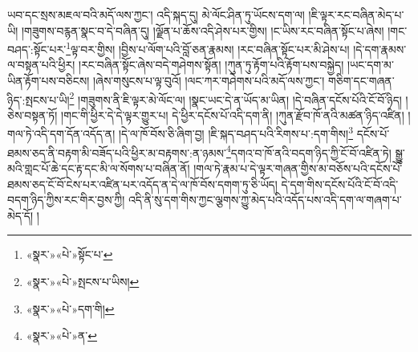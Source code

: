 ཡབ་དང་སྲས་མཇལ་བའི་མདོ་ལས་ཀྱང་། འདི་སྐད་དུ། མེ་ལོང་ཤིན་ཏུ་ཡོངས་དག་ལ། །ཇི་ལྟར་རང་བཞིན་མེད་པ་ཡི། །གཟུགས་བརྙན་སྣང་བ་དེ་བཞིན་དུ། །ལྗོན་པ་ཆོས་འདི་ཤེས་པར་གྱིས། །ང་ཡིས་རང་བཞིན་སྟོང་པ་ཞེས། །གང་བཤད་:སྟོང་པར་\footnote{«སྣར་»«པེ་»སྟོང་པ་}ལྟ་བར་གྱིས། །བྱིས་པ་ལོག་པའི་བློ་ཅན་རྣམས། །རང་བཞིན་སྟོང་པར་མི་ཤེས་པ། །དེ་དག་རྣམས་ལ་བསྟན་པའི་ཕྱིར། །རང་བཞིན་སྟོང་ཞེས་བདེ་གཤེགས་སྟོན། །ཀུན་ཏུ་རྟོག་པའི་རྟོག་པས་བསྐྱེད། །ཡང་དག་མ་ཡིན་རྟོག་པས་བཅིངས། །ཞེས་གསུངས་པ་ལྟ་བུའོ། །ལང་ཀར་གཤེགས་པའི་མདོ་ལས་ཀྱང་། གཅིག་དང་གཞན་ཉིད་:སྤངས་པ་ཡི།\footnote{«སྣར་»«པེ་»སྤངས་པ་ཡིས།} །གཟུགས་ནི་ཇི་ལྟར་མེ་ལོང་ལ། །སྣང་ཡང་དེ་ན་ཡོད་མ་ཡིན། །དེ་བཞིན་དངོས་པོའི་ངོ་བོ་ཉིད། །ཅེས་བསྟན་ཏོ། །གང་གི་ཕྱིར་དེ་དེ་ལྟར་གྱུར་པ། དེ་ཕྱིར་དངོས་པོ་འདི་དག་ནི། །ཀུན་རྫོབ་ཁོ་ནའི་མཚན་ཉིད་འཛིན། །གལ་ཏེ་འདི་དག་དོན་འདོད་ན། །དེ་ལ་ཁོ་བོས་ཅི་ཞིག་བྱ། །ཇི་སྐད་བཤད་པའི་རིགས་པ་:དག་གིས།\footnote{«སྣར་»«པེ་»དག་གི།} དངོས་པོ་ཐམས་ཅད་ནི་བརྟག་མི་བཟོད་པའི་ཕྱིར་མ་བརྟགས་:ན་ཉམས་\footnote{«སྣར་»«པེ་»ན་}དགའ་བ་ཁོ་ནའི་བདག་ཉིད་ཀྱི་ངོ་བོ་འཛིན་ཏེ། སྒྱུ་མའི་གླང་པོ་ཆེ་དང་རྟ་དང་མི་ལ་སོགས་པ་བཞིན་ནོ། །གལ་ཏེ་རྣམ་པ་དེ་ལྟར་གཞན་གྱིས་མ་བཅོས་པའི་དངོས་པོ་ཐམས་ཅད་ངོ་བོ་ངེས་པར་འཛིན་པར་འདོད་ན་དེ་ལ་ཁོ་བོས་དགག་ཏུ་ཅི་ཡོད། དེ་དག་གིས་དངོས་པོའི་ངོ་བོ་འདི་བདག་ཉིད་ཀྱིས་རང་གིར་བྱས་ཀྱི། འདི་ནི་སུ་དག་གིས་ཀྱང་ལྕགས་ཀྱུ་མེད་པའི་འདོད་པས་འདི་དག་ལ་གཞག་པ་མེད་དོ། །
